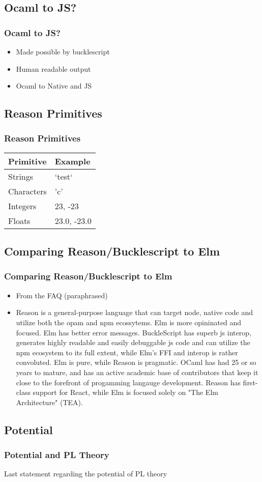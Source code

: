 \documentclass{beamer}
\begin{document}
\begin{frame}
  \section{Ocaml to JS?}
  \frametitle{Ocaml to JS?}
  \pause
  \begin{itemize}
  \item Made possible by bucklescript
    \pause
  \item Human readable output
    \pause
  \item Ocaml to Native and JS
  \end{itemize}
\end{frame}

\begin{frame}
  \section{Reason Primitives}
  \frametitle{Reason Primitives}
  \pause
    \begin{tabular}{ | l | p{5cm} |}
      \hline
      Primitive & Example \\ \hline
      Strings & `test` \\ \hline
      Characters & 'c' \\ \hline
      Integers & 23, -23 \\ \hline
      Floats & 23.0, -23.0 \\
      \hline
    \end{tabular}
\end{frame}


\begin{frame}
  \section{Comparing Reason/Bucklescript to Elm}
  \frametitle{Comparing Reason/Bucklescript to Elm}
  \pause
  \begin{itemize}
  \item From the FAQ (paraphrased)
    \pause
  \item Reason is a general-purpose language that can target node, native code and utilize both the opam and npm ecossytems. Elm is more opininated and focused. Elm has better error messages. BuckleScript has superb js interop, generates highly readable and easily debuggable js code and can utilize the npm ecosystem to its full extent, while Elm's FFI and interop is rather convoluted. Elm is pure, while Reason is pragmatic. OCaml has had 25 or so years to mature, and has an active academic base of contributors that keep it close to the forefront of progamming langauge development. Reason has first-class support for React, while Elm is focused solely on "The Elm Architecture" (TEA).
    \pause
  \end{itemize}
\end{frame}


\begin{frame}
  \section{Potential}
    \frametitle{Potential and PL Theory}
    Last statement regarding the potential of PL theory
\end{frame}
\end{document}
